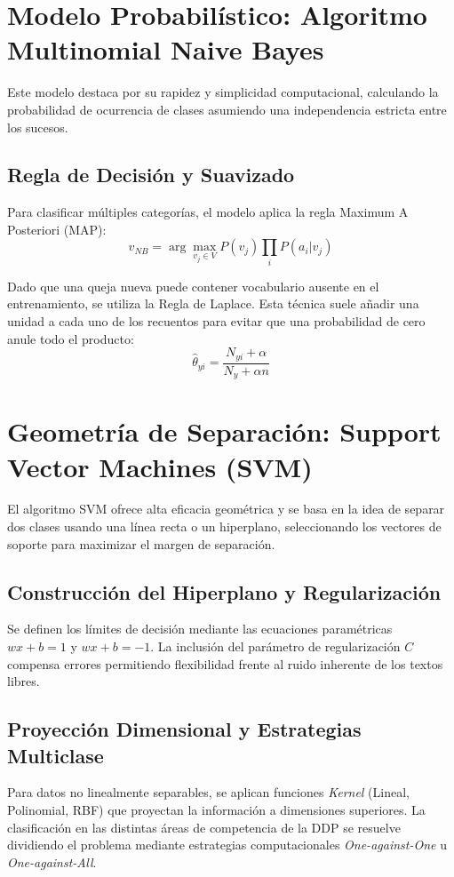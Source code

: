 \section{Modelo Probabilístico: Algoritmo Multinomial Naive Bayes}

    Este modelo destaca por su rapidez y simplicidad computacional, calculando la probabilidad de ocurrencia de clases asumiendo una independencia estricta entre los sucesos.

    \subsection{Regla de Decisión y Suavizado}
    Para clasificar múltiples categorías, el modelo aplica la regla Maximum A Posteriori (MAP):
    $$v_{NB}=\arg\max_{v_{j}\in V}P(v_{j})\prod_{i}P(a_{i}|v_{j})$$
    
    Dado que una queja nueva puede contener vocabulario ausente en el entrenamiento, se utiliza la Regla de Laplace. Esta técnica suele añadir una unidad a cada uno de los recuentos para evitar que una probabilidad de cero anule todo el producto:
    $$\hat{\theta}_{yi}=\frac{N_{yi}+\alpha}{N_{y}+\alpha n}$$

\section{Geometría de Separación: Support Vector Machines (SVM)}

    El algoritmo SVM ofrece alta eficacia geométrica y se basa en la idea de separar dos clases usando una línea recta o un hiperplano, seleccionando los vectores de soporte para maximizar el margen de separación.
    
    \subsection{Construcción del Hiperplano y Regularización}
    Se definen los límites de decisión mediante las ecuaciones paramétricas $wx+b=1$ y $wx+b=-1$. La inclusión del parámetro de regularización $C$ compensa errores permitiendo flexibilidad frente al ruido inherente de los textos libres.
    
    \subsection{Proyección Dimensional y Estrategias Multiclase}
    Para datos no linealmente separables, se aplican funciones \textit{Kernel} (Lineal, Polinomial, RBF) que proyectan la información a dimensiones superiores. La clasificación en las distintas áreas de competencia de la DDP se resuelve dividiendo el problema mediante estrategias computacionales \textit{One-against-One} u \textit{One-against-All}.

